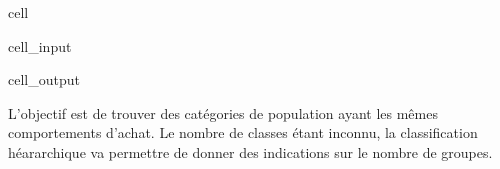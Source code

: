 \documentclass[letterpaper,10pt,english]{jupyterBook}
\begin{document}
\begin{sphinxuseclass}{cell}
\begin{sphinxVerbatimInput}
\begin{sphinxuseclass}{cell_input}
\end{sphinxuseclass}\end{sphinxVerbatimInput}
\begin{sphinxVerbatimOutput}

\begin{sphinxuseclass}{cell_output}
\noindent{}

\end{sphinxuseclass}\end{sphinxVerbatimOutput}

\end{sphinxuseclass}
\sphinxAtStartPar
L’objectif est de trouver des catégories de population ayant les mêmes comportements d’achat. Le nombre de classes étant inconnu, la classification héararchique va permettre de donner des indications sur le nombre de groupes.
\end{document}

